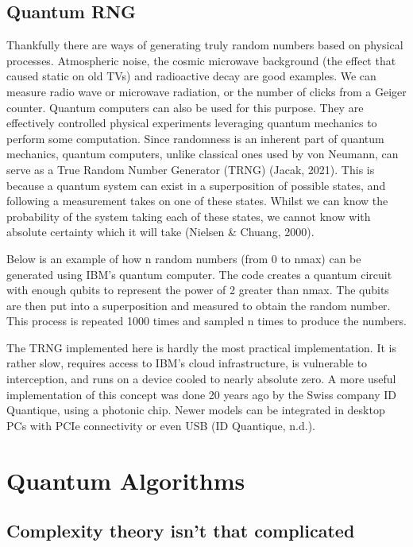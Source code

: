 \documentclass{book}
\begin{document}
\section{Quantum RNG}

Thankfully there are ways of generating truly random numbers based on physical processes. Atmospheric noise, the cosmic microwave background (the effect that caused static on old TVs) and radioactive decay are good examples. We can measure radio wave or microwave radiation, or the number of clicks from a Geiger counter.
Quantum computers can also be used for this purpose. They are effectively controlled physical experiments leveraging quantum mechanics to perform some computation. Since randomness is an inherent part of quantum mechanics, quantum computers, unlike classical ones used by von Neumann, can serve as a True Random Number Generator (TRNG) (Jacak, 2021). This is because a quantum system can exist in a superposition of possible states, and following a measurement takes on one of these states. Whilst we can know the probability of the system taking each of these states, we cannot know with absolute certainty which it will take (Nielsen \& Chuang, 2000).

Below is an example of how n random numbers (from 0 to nmax) can be generated using IBM’s quantum computer. The code creates a quantum circuit with enough qubits to represent the power of 2 greater than nmax. The qubits are then put into a superposition and measured to obtain the random number. This process is repeated 1000 times and sampled n times to produce the numbers.  

The TRNG implemented here is hardly the most practical implementation. It is rather slow, requires access to IBM’s cloud infrastructure, is vulnerable to interception, and runs on a device cooled to nearly absolute zero. A more useful implementation of this concept was done 20 years ago by the Swiss company ID Quantique, using a photonic chip. Newer models can be integrated in desktop PCs with PCIe connectivity or even USB (ID Quantique, n.d.).

\chapter{Quantum Algorithms}


\section{ Complexity theory isn't that complicated}
\end{document}
